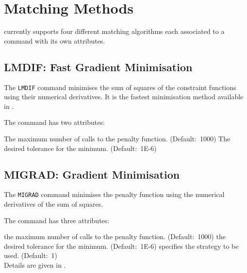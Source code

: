 

%

\section{Matching Methods}
\label{sec:match_methods}

\madx currently supports four different matching algorithms each associated to 
a command with its own attributes. 

\subsection{LMDIF: Fast Gradient Minimisation}
\label{subsec:match_lmdif}
The {\tt LMDIF} command minimises the sum of squares of the constraint
functions using their numerical derivatives. It is the fastest
minimisation method available in \madx.
 

The command has two attributes:  
\begin{madlist}
    The maximum number of calls to the penalty
   function. (Default:~1000) 
    The desired tolerance for the minimum. 
   (Default:~1E-6)  
\end{madlist}

\subsection{MIGRAD: Gradient Minimisation}
\label{subsec:match_migrad}
The {\tt MIGRAD} command minimises the penalty function using the numerical
derivatives of the sum of squares.  


The command has three attributes: 
\begin{madlist}
    the maximum number of calls to the penalty
   function. (Default:~1000) 
    the desired tolerance for the minimum. 
   (Default:~1E-6)
    specifies the strategy to be used. (Default:~1) \\
   Details are given in \cite{MINUIT}.  
\end{madlist} 

